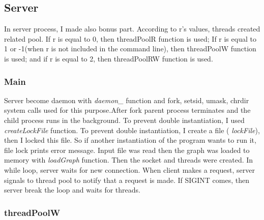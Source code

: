 \documentclass[twoside,11pt]{article}
\begin{document}
\subsection{Server}

In server process, I made also bonus part. According to r's values, threads created related pool. If r is equal to 0, then threadPoolR function is used; If r is equal to 1 or -1(when r is not included in the command line), then threadPoolW function is used; and if r is equal to 2, then threadPoolRW function is used.

\subsubsection{Main}

Server become daemon with \emph{daemon\_} function and fork, setsid, umask, chrdir system calls used for this purpose.After fork parent process terminates and the child process runs in the background. To prevent double instantiation, I used \emph{createLockFile} function. To prevent double instantiation, I create a file ( \emph{lockFile}), then I locked this file. So if another instantiation of the program wants to run it, file lock prints error message.
\newline
Input file was read then the graph was loaded to memory with \emph{loadGraph} function. Then the socket and threads were created. 
\newline
In while loop, server waits for new connection. When client makes a request, server signals to thread pool to notify that a request is made. If SIGINT comes, then server break the loop and waits for threads.

\subsubsection{threadPoolW}
\end{document}
